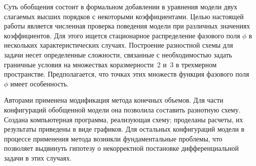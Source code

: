 Суть обобщения состоит в формальном добавлении в уравнения модели двух слагаемых высших порядков с некоторыми коэффициентами. Целью настоящей работы является численная проверка поведения модели при различных значениях коэффициентов. Для этого ищется стационарное распределение фазового поля $\phi$ в нескольких характеристических случаях. Построение разностной схемы для задачи несет определенные сложности, связанные с необходимостью задать граничные условия на множествах коразмерности~2 и~3 в трехмерном пространстве. Предполагается, что точках этих множеств функция фазового поля $\phi$ имеет особенность.

Авторами применена модификация метода конечных объемов. Для части конфигураций обобщенной модели она позволила составить разнотную схему. Создана компьютерная программа, реализующая схему; проделаны расчеты, их результаты приведены в виде графиков. Для остальных конфигураций модели в процессе применения метода возникли фундаментальные проблемы, что позволяет выдвинуть гипотезу о некорректной постановке дифференциальной задачи в этих случаях.